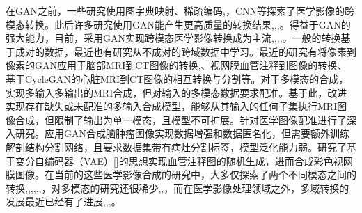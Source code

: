\documentclass[letterpaper]{article} %
\begin{document}
在GAN之前，一些研究使用图字典映射\cite{22burgos2015robust}、稀疏编码\cite{33huang2017simultaneous},\cite{34vemulapalli2015unsupervised}，CNN\cite{36vannguyen2015crossdomain}等探索了医学影像的跨模态转换。此后许多研究使用GAN能产生更高质量的转换结果\cite{1zhao2018modular},\cite{5liang2018generative},\cite{6zhu2017unpaired},\cite{13choi2018stargan:}。得益于GAN的强大能力，目前，采用GAN实现跨模态医学影像转换成为主流\cite{2zhang2018translating},\cite{20nie2017medical},\cite{35osokin2017gans},\cite{36vannguyen2015crossdomain},\cite{40kamnitsas2017unsupervised}。一般的转换基于成对的数据，最近也有研究从不成对的跨域数据中学习\cite{2zhang2018translating}。最近的研究有将像素到像素的GAN应用于脑部MRI到CT图像的转换\cite{20nie2017medical},\cite{40kamnitsas2017unsupervised}、视网膜血管注释到图像的转换\cite{41costa2017towards}、基于CycleGAN\cite{6zhu2017unpaired}的心脏MRI到CT图像的相互转换与分割\cite{20nie2017medical}等。对于多模态的合成，\cite{84chartsias2018multimodal}实现多输入多输出的MRI合成，但对输入的多模态数据要求配准。基于此，\cite{85joyce2017robust}改进实现存在缺失或未配准的多输入合成模型，能够从其输入的任何子集执行MRI图像合成，但限制了输出为单一模态，且模型不可扩展。\cite{66miao2018dilated}针对医学图像配准进行了深入研究。\cite{4shin2018medical}应用GAN合成脑肿瘤图像实现数据增强和数据匿名化，但需要额外训练解剖结构分割网络，且要求数据集带有病灶分割标签，模型泛化能力弱。\cite{41costa2017towards}研究了基于变分自编码器（VAE）[]的思想实现血管注释图的随机生成，进而合成彩色视网膜图像。在当前的这些医学影像合成的研究中，大多仅探索了两个不同模态之间的转换\cite{2zhang2018translating},\cite{20nie2017medical},\cite{22burgos2015robust},\cite{34vemulapalli2015unsupervised},\cite{35osokin2017gans},\cite{36vannguyen2015crossdomain},\cite{40kamnitsas2017unsupervised}，对多模态的研究还很稀少\cite{84chartsias2018multimodal},\cite{85joyce2017robust},\cite{4shin2018medical}，而在医学影像处理领域之外，多域转换的发展最近已经有了进展\cite{1zhao2018modular},\cite{5liang2018generative},\cite{13choi2018stargan:},\cite{27isola2017image-to-image}。
\end{document}
